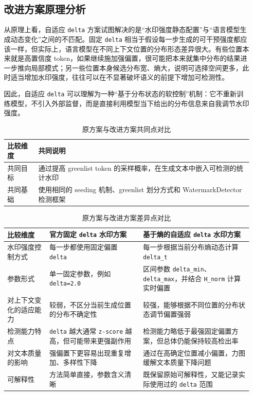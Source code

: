\documentclass{SYSUReport}
\begin{document}
\subsection{改进方案原理分析}

从原理上看，自适应 \texttt{delta} 方案试图解决的是“水印强度静态配置”与“语言模型生成动态变化”之间的不匹配。固定 \texttt{delta} 相当于假设每一步生成的可干预强度都应该一样，但实际上，语言模型在不同上下文位置的分布形态差异很大。有些位置本来就是高置信度 token，如果继续施加强偏置，很可能把本来就集中分布的结果进一步推向局部模式；另一些位置本身候选分布宽、熵大，说明可选择空间更多，此时适当增加水印强度，往往可以在不显著破坏语义的前提下增加可检测性。

因此，自适应 \texttt{delta} 可以理解为一种“基于分布状态的软控制”机制：它不重新训练模型，不引入外部监督，而是直接利用模型当下给出的分布信息来自我调节水印强度。

\begin{table}[H]
    \centering
    \caption{原方案与改进方案共同点对比}
    \begin{tabularx}{0.92\textwidth}{>{\raggedright\arraybackslash}p{} X}
        \toprule
        比较维度 & 共同说明 \\
        \midrule
        共同目标 & 通过提高 greenlist token 的采样概率，在生成文本中嵌入可检测的统计水印 \\
        共同基础 & 使用相同的 seeding 机制、greenlist 划分方式和 WatermarkDetector 检测框架 \\
        \bottomrule
    \end{tabularx}
\end{table}

\begin{table}[H]
    \centering
    \caption{原方案与改进方案差异点对比}
    \begin{tabularx}{0.96\textwidth}{>{\raggedright\arraybackslash}p{} X X}
        \toprule
        比较维度 & 官方固定 \texttt{delta} 水印方案 & 基于熵的自适应 \texttt{delta} 水印方案 \\
        \midrule
        水印强度控制方式 & 每一步都使用固定偏置 \texttt{delta} & 每一步根据当前分布熵动态计算 \texttt{delta\_t} \\
        参数形式 & 单一固定参数，例如 \texttt{delta=2.0} & 区间参数 \texttt{delta\_min}、\texttt{delta\_max}，并结合 \texttt{H\_norm} 计算实时偏置 \\
        对上下文变化的适应能力 & 较弱，不区分当前生成位置的分布不确定性 & 较强，能够根据不同位置的分布状态调节偏置强弱 \\
        检测能力特点 & \texttt{delta} 越大通常 \texttt{z-score} 越高，但可能带来更强副作用 & 检测能力略低于最强固定偏置方案，但总体仍能保持较高检出率 \\
        对文本质量的影响 & 强偏置下更容易出现重复增加、多样性下降 & 通过在高确定位置减小偏置，力图缓解文本质量下降问题 \\
        可解释性 & 方法简单直接，参数含义清晰 & 既保留原始可解释性，又能记录实际使用过的 \texttt{delta} 范围 \\
        \bottomrule
    \end{tabularx}
\end{table}
\end{document}
